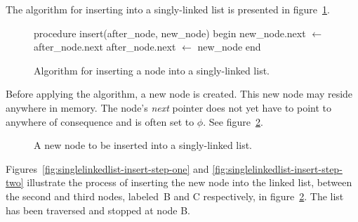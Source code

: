 \documentclass{article}
\begin{document}
  The algorithm for inserting into a singly-linked list is presented in figure~\ref{fig:alg:singlelinkedlist-insert}.
  \begin{figure}[h]
    \begin{algorithm}
      procedure insert(after_node, new_node)
      begin
        new_node.next $\gets$ after_node.next
        after_node.next $\gets$ new_node
      end\end{algorithm}
    \caption{Algorithm for inserting a node into a singly-linked list.}
    \label{fig:alg:singlelinkedlist-insert}
  \end{figure}

  Before applying the algorithm, a new node is created. This new node may reside anywhere in memory. The node's \emph{next} pointer does not yet have to point to anywhere of consequence and is often set to $\phi$. See figure~\ref{fig:singlelinkedlist-newnode}.
  \begin{figure}[h]
    \centering
    \caption{A new node to be inserted into a singly-linked list.}
    \label{fig:singlelinkedlist-newnode}
  \end{figure}

  Figures~\ref{fig:singlelinkedlist-insert-step-one} and \ref{fig:singlelinkedlist-insert-step-two} illustrate the process of inserting the new node into the linked list, between the second and third nodes, labeled~B and C respectively, in figure~\ref{fig:singlelinkedlist-newnode}. The list has been traversed and stopped at node B.
\end{document}
